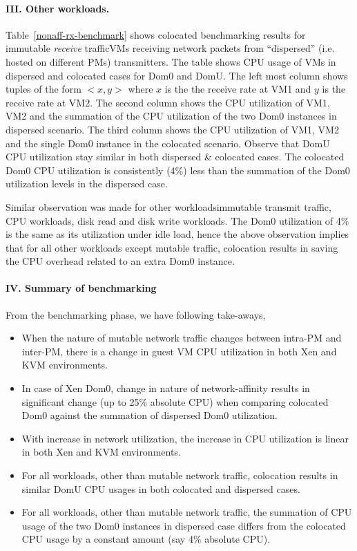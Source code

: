 \paragraph{III. Other workloads.}
Table~\ref{nonaff-rx-benchmark} shows colocated benchmarking
results for immutable \textit{receive} traffic\textemdash{}VMs receiving 
network packets from ``dispersed'' (i.e. hosted on different PMs) transmitters. 
The table shows CPU usage of VMs in
dispersed and colocated cases for Dom0 and DomU.
The left most column shows tuples of the form $<x,y>$ where
$x$ is the the receive rate at VM1 and $y$ is the receive
rate at VM2. The second column shows the CPU utilization of 
VM1, VM2 and the summation of the CPU utilization of the two 
Dom0 instances in dispersed scenario. The third column shows
the CPU utilization of VM1, VM2 and the single Dom0 instance
in the colocated scenario.
Observe that
DomU CPU utilization stay similar in both dispersed \& colocated
cases.
The colocated Dom0
CPU utilization is consistently (4\%) less than 
the summation of the Dom0 utilization
levels in the dispersed case.

Similar observation was made for other workloads\textemdash{}immutable
transmit traffic, CPU workloads, disk read and disk write workloads. 
The Dom0 utilization of 4\% is the same as its utilization
under idle load, hence the above observation implies that for all
other workloads except mutable traffic, colocation results in saving
the CPU overhead related to an extra Dom0 instance.

\paragraph{IV. Summary of benchmarking}
From the benchmarking phase, we have following take-aways,
\begin{itemize}
  \item When the nature of mutable network traffic changes between intra-PM
				  and inter-PM, there
				  is a change in guest VM CPU utilization in both Xen
				  and KVM environments. 
  \item In case of Xen Dom0, change in nature of network-affinity results
				  in significant change (up to 25\% absolute CPU) when comparing
				  colocated Dom0 against the summation of dispersed Dom0 utilization.
  \item With increase in network utilization, 
	  the increase in CPU utilization is linear
			 in both Xen and KVM environments.
	\item For all workloads, other than mutable network traffic, colocation results
		in similar DomU CPU usages in both colocated and dispersed cases.
	\item For all workloads, other than mutable network traffic, the summation of CPU 
		usage of the two Dom0 instances in dispersed case differs from the 
		colocated CPU usage by a constant amount (say 4\% absolute CPU). 
\end{itemize}
		  
